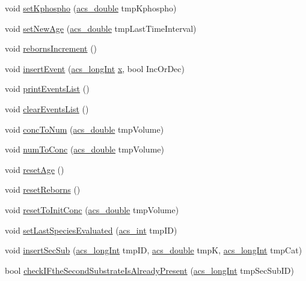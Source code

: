 \begin{DoxyCompactItemize}
\item 
void \hyperlink{a00022_a4d33fdb252e1884841f9c671ce25973c}{set\-Kphospho} (\hyperlink{a00050_ab776853a005fcbf56af0424a2a4dd607}{acs\-\_\-double} tmp\-Kphospho)
\item 
void \hyperlink{a00022_aa73ab15fb28aefd3b0c6b19e7c9bb944}{set\-New\-Age} (\hyperlink{a00050_ab776853a005fcbf56af0424a2a4dd607}{acs\-\_\-double} tmp\-Last\-Time\-Interval)
\item 
void \hyperlink{a00022_a90d5fc1d90637f2245e8b0ecf228ddfa}{reborns\-Increment} ()
\item 
void \hyperlink{a00022_af3d02dd1b6791d4511d271528b4b166f}{insert\-Event} (\hyperlink{a00050_a19319d75f02db4308bc5c0026d98cd85}{acs\-\_\-long\-Int} \hyperlink{a00031_a7265972fe485274cfff77a9bb07b8fce}{x}, bool Inc\-Or\-Dec)
\item 
void \hyperlink{a00022_adb9034fecf662567aec4418d41769543}{print\-Events\-List} ()
\item 
void \hyperlink{a00022_a625274ee9a1b299cfdf0f84888b1353e}{clear\-Events\-List} ()
\item 
void \hyperlink{a00022_a9842732a5dbe0eb67e24148b5d7ae4a2}{conc\-To\-Num} (\hyperlink{a00050_ab776853a005fcbf56af0424a2a4dd607}{acs\-\_\-double} tmp\-Volume)
\item 
void \hyperlink{a00022_a23c19a53390142ba690d0f3db0520d05}{num\-To\-Conc} (\hyperlink{a00050_ab776853a005fcbf56af0424a2a4dd607}{acs\-\_\-double} tmp\-Volume)
\item 
void \hyperlink{a00022_a911d4db36e84690d19abb2902a734524}{reset\-Age} ()
\item 
void \hyperlink{a00022_a4884d8bce59ddb79e87e08f3ed16633f}{reset\-Reborns} ()
\item 
void \hyperlink{a00022_acc180a103e6681da2add266aafda3eb9}{reset\-To\-Init\-Conc} (\hyperlink{a00050_ab776853a005fcbf56af0424a2a4dd607}{acs\-\_\-double} tmp\-Volume)
\item 
void \hyperlink{a00022_a8daa007da55f042b9c436f956836f4d8}{set\-Last\-Species\-Evaluated} (\hyperlink{a00050_a8d277355641a098190360234e2ebde35}{acs\-\_\-int} tmp\-I\-D)
\item 
void \hyperlink{a00022_a0da8d53a216583f7790b12362da376a3}{insert\-Sec\-Sub} (\hyperlink{a00050_a19319d75f02db4308bc5c0026d98cd85}{acs\-\_\-long\-Int} tmp\-I\-D, \hyperlink{a00050_ab776853a005fcbf56af0424a2a4dd607}{acs\-\_\-double} tmp\-K, \hyperlink{a00050_a19319d75f02db4308bc5c0026d98cd85}{acs\-\_\-long\-Int} tmp\-Cat)
\item 
bool \hyperlink{a00022_af04a95fb2b35bf988271a60413ec508e}{check\-I\-Fthe\-Second\-Substrate\-Is\-Already\-Present} (\hyperlink{a00050_a19319d75f02db4308bc5c0026d98cd85}{acs\-\_\-long\-Int} tmp\-Sec\-Sub\-I\-D)

\end{DoxyCompactItemize}
